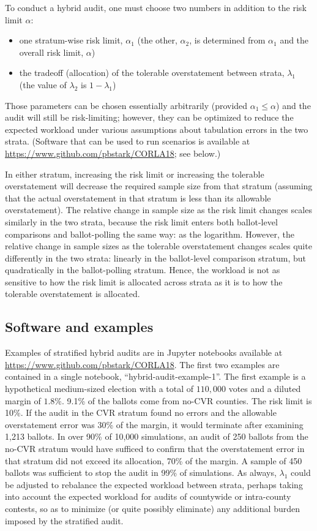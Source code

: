 \documentclass[12pt]{article}
\begin{document}
To conduct a hybrid audit, one must choose two numbers
in addition to the risk limit $\alpha$:
\begin{itemize}
   \item one stratum-wise risk limit, $\alpha_1$ 
(the other, $\alpha_2$, is determined from $\alpha_1$ and the overall risk limit, $\alpha$)
   \item the tradeoff (allocation) of the tolerable overstatement between strata, $\lambda_1$
(the value of $\lambda_2$ is $1-\lambda_1$)
\end{itemize}
Those parameters can be chosen essentially arbitrarily (provided $\alpha_1 \le \alpha$)
and the audit will still be risk-limiting;
however, they can be optimized to reduce the expected workload under various
assumptions about tabulation errors in the two strata.
(Software that can be used to run scenarios is available at 
\url{https://www.github.com/pbstark/CORLA18}; see below.)

In either stratum, increasing the risk limit or increasing the tolerable overstatement will decrease
the required sample size from that stratum (assuming that the actual overstatement in
that stratum is less than its allowable overstatement).
The relative change in sample size as the risk limit changes scales similarly in the two strata, 
because the risk limit 
enters both ballot-level comparisons and ballot-polling the same way: as the logarithm.
However, the relative change in sample sizes as the tolerable overstatement changes
scales quite differently in the two strata: linearly in the ballot-level comparison stratum,
but quadratically in the ballot-polling stratum.
Hence, the workload is not as sensitive to how the risk limit is allocated across strata
as it is to how the tolerable overstatement is allocated.

\subsection{Software and examples}
Examples of stratified hybrid audits are in Jupyter notebooks available
at \url{https://www.github.com/pbstark/CORLA18}.
The first two examples are contained in a single notebook, ``hybrid-audit-example-1''.
The first example is a hypothetical medium-sized election with a total of 
$110,000$ votes and a diluted margin of $1.8\%$.
9.1\% of the ballots come from no-CVR counties. The risk limit is 10\%.
If the audit in the CVR stratum found no errors and the allowable overstatement error was 30\% of the margin, 
it would terminate after examining 1,213 ballots.
In over 90\% of 10,000 simulations, an audit of 250 ballots from the no-CVR stratum
would have sufficed to confirm that the overstatement error in that stratum
did not exceed its allocation, 70\% of the margin.
A sample of 450 ballots was sufficient to stop the audit in 99\% of simulations.
As always, $\lambda_1$ could be adjusted to
rebalance the expected workload between strata, perhaps taking into account the expected
workload for audits of countywide or intra-county contests, so as to minimize (or quite possibly
eliminate) any additional burden imposed by the stratified audit.
\end{document}
